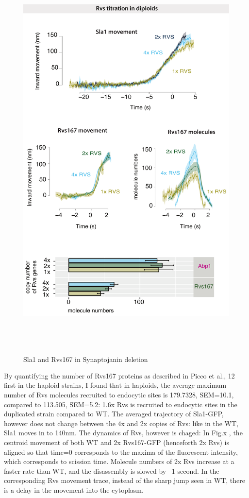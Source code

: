 		\begin{figure}
	\centering
	\includegraphics[width=21cm,height=21cm,keepaspectratio]{figures/results_final/protein_friction2}
	\caption{Sla1 and Rvs167 in Synaptojanin deletion \label{fig5}}
	\end{figure}

	\vspace{5mm}
	By quantifying the number of Rvs167 proteins as described in Picco et al., 12  first in the haploid strains, I found that in haploids, the average maximum number of Rvs molecules recruited to endocytic sites is 179.7328, SEM=10.1, compared to 113.505, SEM=5.2:  1.6x Rvs is recruited to endocytic sites in the duplicated strain compared to WT. The averaged trajectory of Sla1-GFP, however does not change between the 4x and 2x copies of Rvs: like in the WT, Sla1 moves in to 140nm. The dynamics of Rvs, however is chaged: In Fig.x , the centroid movement of both WT and 2x Rvs167-GFP (henceforth 2x Rvs) is aligned so that time=0 corresponds to the maxima of the fluorescent intensity, which corresponds to scission time. Molecule numbers of 2x Rvs increase at a faster rate than WT, and the disassembly is slowed by ~1 second. In the corresponding Rvs movement trace, instead of the sharp jump seen in WT, there is a delay in the movement into the cytoplasm.


